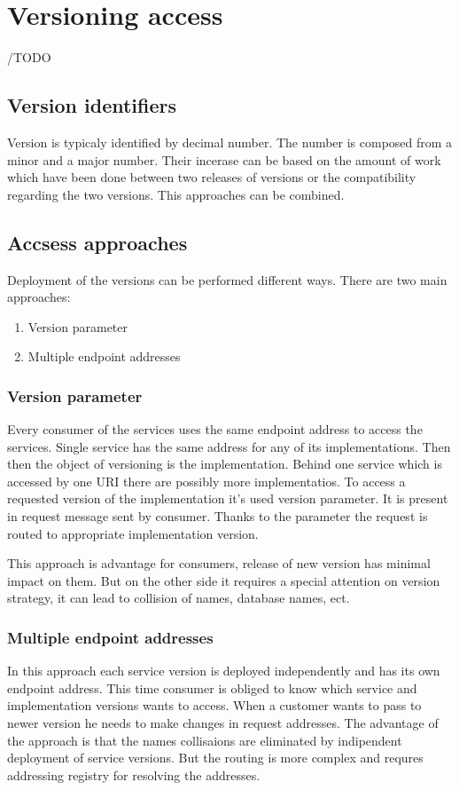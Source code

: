 \chapter{Versioning access}
\label{chap:versionaccess}

/TODO


\section{Version identifiers}
Version is typicaly identified by decimal number. The number is composed from a minor and a major number. Their incerase can be based on the amount of work which have been done between two releases of versions or the compatibility regarding the two versions. This approaches can be combined.

\section{Accsess approaches}
Deployment of the versions can be performed different ways. There are two main approaches:
\begin{enumerate}
  \item Version parameter
  \item Multiple endpoint addresses
\end{enumerate}

\subsection{Version parameter}
Every consumer of the services uses the same endpoint address to access the services. Single service has the same address for any of its implementations. Then then the object of versioning is the implementation. Behind one service which is accessed by one URI there are possibly more implementatios.
To access a requested version of the implementation it's used version parameter. It is present in request message sent by consumer. Thanks to the parameter the request is routed to appropriate implementation version.

This approach is advantage for consumers, release of new version has minimal impact on them. But on the other side it requires a special attention on version strategy, it can lead to collision of names, database names, ect.

\subsection{Multiple endpoint addresses}
In this approach each service version is deployed independently and has its own endpoint address. This time consumer is obliged to know which service and implementation versions wants to access. When a customer wants to pass to newer version he needs to make changes in request addresses. The advantage of the approach is that the names collisaions are eliminated by indipendent deployment of service versions. But the routing is more complex and requres addressing registry for resolving the addresses.

